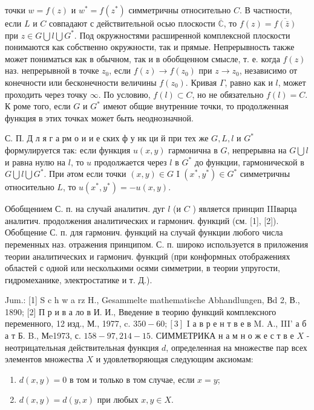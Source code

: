 \documentclass[10pt]{article}
\begin{document}
точки $w=f(z)$ и $w^{*}=f\left(z^{*}\right)$ симметричны относительно $C$. В частности, если $L$ и $C$ совпадают с действительной осью плоскости $\overline{\mathbb{C}}$, то $f(z)=\overline{f(\bar{z})}$ при $z \in G \bigcup l \bigcup G^{*}$. Под окружностями расширенной комплексной плоскости понимаются как собственно окружности, так и прямые. Непрерывность также может пониматься как в обычном, так и в обобщенном смысле, т. е. когда $f(z)$ наз. непрерывной в точке $z_{0}$, если $f(z) \rightarrow f\left(z_{0}\right)$ при $z \rightarrow z_{0}$, независимо от конечности или бесконечности величины $f\left(z_{0}\right)$. Кривая $\Gamma$, равно как и $l$, может проходить через точку $\infty$. По условию, $f(l) \subset C$, но не обязательно $f(l)=C$. К роме того, если $G$ и $G^{*}$ имеют общие внутренние точки, то продолженная функция в этих точках может быть неоднозначной.



С. П. Д л я г а рм о и и е ских ф у нк ци й при тех же $G, L, l$ и $G^{*}$ формулируется так: если функция $u(x, y)$ гармонична в $G$, непрерывна на $G \bigcup l$ и равна нулю на $l$, то $u$ продолжается через $l$ в $G^{*}$ до функции, гармонической в $G \bigcup l \bigcup G^{*}$. При әтом если точки $(x, y) \in G$ I $\left(x^{*}, y^{*}\right) \in G^{*}$ симметричны относительно $L$, то $u\left(x^{*}, y^{*}\right)=-u(x, y)$.



Обобщением С. п. на случай аналитич. дуг $l$ (и $C$ ) является принцип IIIварца аналитич. продолжения аналитических и гармонич. функций (см. [1], [2]). Обобщение С. п. для гармонич. функций на случай функции любого числа переменных наз. отражения принципом. С. п. широко используется в приложения теории аналитических и гармонич. функций (при конформных отображениях областей с одной или несколькими осями симметрии, в теории упругости, гидромеханике, электростатике и т. Д.).



Jum.: [1] S c h w a rz H., Gesammelte mathematische Abhandlungen, Вd 2, В., 1890; [2] П р и в а ло в И. И., Введение в теорию функций комплексного переменного, 12 изд., М., 1977, c. $350-60 ;[3]$ I а в р е н т в е в M. A., III' а б а т Б. B., Мe1973, с. $158-97,214-15$. СИММЕТРИКА н а м н о ж е с т в е $X$ - неотрицательная действительная функция $d$, определенная на множестве пар всех элементов множества $X$ и удовлетворяющая следующим аксиомам:



\begin{enumerate}

  \item $d(x, y)=0$ в том и только в том случае, если $x=y$;



  \item $d(x, y)=d(y, x)$ при любых $x, y \in X$.



\end{enumerate}
\end{document}
